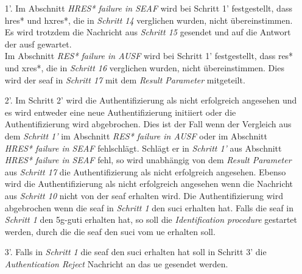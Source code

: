 \begin{enumerate}
\item[1'.] Im Abschnitt \textit{HRES* failure in SEAF} wird bei Schritt 1' festgestellt, dass \gls{hres*} und \gls{hxres*}, die in \textit{Schritt 14} verglichen wurden, nicht übereinstimmen. 
Es wird trotzdem die Nachricht aus \textit{Schritt 15} gesendet und auf die Antwort der \gls{ausf} gewartet. \\
Im Abschnitt \textit{RES* failure in AUSF} wird bei Schritt 1' festgestellt, dass \gls{res*} und \gls{xres*}, die in \textit{Schritt 16} verglichen wurden, nicht übereinstimmen.
Dies wird der \gls{seaf} in \textit{Schritt 17} mit dem \textit{Result Parameter} mitgeteilt.

\item[2'.] Im Schritt 2' wird die Authentifizierung als nicht erfolgreich angesehen und es wird entweder eine neue Authentifizierung initiiert oder die Authentifizierung wird abgebrochen.
Dies ist der Fall wenn der Vergleich aus dem \textit{Schritt 1'} im Abschnitt \textit{RES* failure in AUSF} oder im Abschnitt \textit{HRES* failure in SEAF} fehlschlägt.
Schlägt er in \textit{Schritt 1'} aus Abschnitt \textit{HRES* failure in SEAF} fehl, so wird unabhängig von dem \textit{Result Parameter} aus \textit{Schritt 17} die Authentifizierung als nicht erfolgreich angesehen.
Ebenso wird die Authentifizierung als nicht erfolgreich angesehen wenn die Nachricht aus \textit{Schritt 10} nicht von der \gls{seaf} erhalten wird.
Die Authentifizierung wird abgebrochen wenn die \gls{seaf} in \textit{Schritt 1} den \gls{suci} erhalten hat.
Falls die \gls{seaf} in \textit{Schritt 1} den \gls{5g-guti} erhalten hat, so soll die \textit{Identification procedure} gestartet werden, durch die die \gls{seaf} den \gls{suci} vom \gls{ue} erhalten soll.

\item[3'.] Falls in \textit{Schritt 1} die \gls{seaf} den \gls{suci} erhalten hat soll in Schritt 3' die \textit{Authentication Reject} Nachricht an das \gls{ue} gesendet werden.
\end{enumerate}













